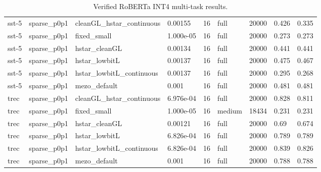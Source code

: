 \begin{table}[t]
\begin{tabular}{lllllllll}
sst-5 & sparse\_p0p1 & cleanGL\_hstar\_continuous & 0.00155 & 16 & full & 20000 & 0.426 & 0.335 \\
sst-5 & sparse\_p0p1 & fixed\_small & 1.000e-05 & 16 & full & 20000 & 0.273 & 0.273 \\
sst-5 & sparse\_p0p1 & hstar\_cleanGL & 0.00134 & 16 & full & 20000 & 0.441 & 0.441 \\
sst-5 & sparse\_p0p1 & hstar\_lowbitL & 0.00137 & 16 & full & 20000 & 0.475 & 0.467 \\
sst-5 & sparse\_p0p1 & hstar\_lowbitL\_continuous & 0.00137 & 16 & full & 20000 & 0.295 & 0.268 \\
sst-5 & sparse\_p0p1 & mezo\_default & 0.001 & 16 & full & 20000 & 0.481 & 0.481 \\
trec & sparse\_p0p1 & cleanGL\_hstar\_continuous & 6.976e-04 & 16 & full & 20000 & 0.828 & 0.811 \\
trec & sparse\_p0p1 & fixed\_small & 1.000e-05 & 16 & medium & 18434 & 0.231 & 0.231 \\
trec & sparse\_p0p1 & hstar\_cleanGL & 0.00121 & 16 & full & 20000 & 0.69 & 0.674 \\
trec & sparse\_p0p1 & hstar\_lowbitL & 6.826e-04 & 16 & full & 20000 & 0.789 & 0.789 \\
trec & sparse\_p0p1 & hstar\_lowbitL\_continuous & 6.826e-04 & 16 & full & 20000 & 0.839 & 0.826 \\
trec & sparse\_p0p1 & mezo\_default & 0.001 & 16 & full & 20000 & 0.788 & 0.788 \\
\bottomrule
\end{tabular}
\caption{Verified RoBERTa INT4 multi-task results.}
\label{tab:roberta_multitask}
\end{table}
